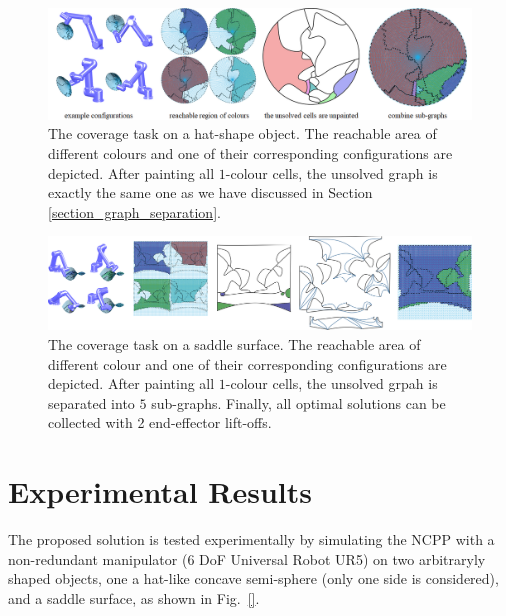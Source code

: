 \documentclass[conference]{IEEEtran}
\begin{document}
\begin{figure}[t]
\centering
\includegraphics[width=\textwidth]{figures/hat_exp/fig_hat_2}
\caption{The coverage task on a hat-shape object. The reachable area of different colours and one of their corresponding configurations are depicted. After painting all $1$-colour cells, the unsolved graph is exactly the same one as we have discussed in Section \ref{section_graph_separation}. }\label{fig:hat}
\end{figure}
\begin{figure}[t]
\centering
\includegraphics[width=\textwidth]{figures/saddle_exp/comb}
\caption{The coverage task on a saddle surface. The reachable area of different colour and one of their corresponding configurations are depicted. After painting all $1$-colour cells, the unsolved grpah is separated into $5$ sub-graphs. Finally, all optimal solutions can be collected with 2 end-effector lift-offs.    }
\label{fig:saddle}
\end{figure}

\section{Experimental Results}\label{section_experiment}
\label{section_results}

The proposed solution is tested experimentally by simulating the NCPP with a non-redundant manipulator (6 DoF Universal Robot UR5) on two arbitraryly shaped objects, one a hat-like concave semi-sphere (only one side is considered), and a saddle surface, as shown in Fig.~\ref{}.
\end{document}
